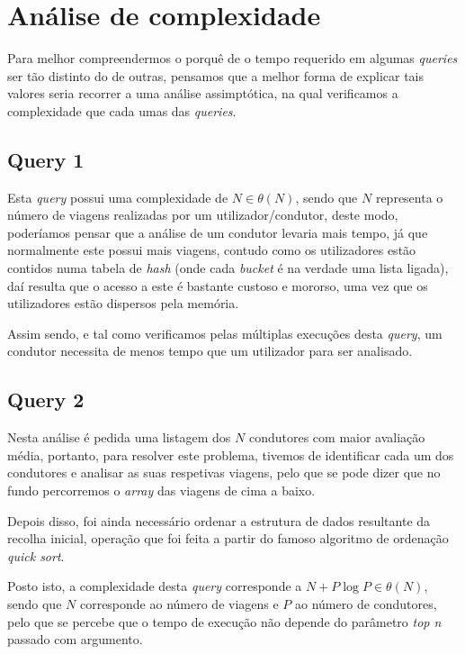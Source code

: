 \documentclass[12pt,a4paper]{report}
\begin{document}
\chapter{Análise de complexidade}

Para melhor compreendermos o porquê de o tempo requerido em algumas \textit{queries} ser tão distinto do de outras, pensamos que a melhor forma de explicar tais valores seria recorrer a uma análise assimptótica, na qual verificamos a complexidade que cada umas das \textit{queries}.

\section{Query 1}

Esta \textit{query} possui uma complexidade de \( N \in \theta(N)\), sendo que \(N\) representa o número de viagens realizadas por um utilizador/condutor, deste modo, poderíamos pensar que a análise de um condutor levaria mais tempo, já que normalmente este possui mais viagens, contudo como os utilizadores estão contidos numa tabela de \textit{hash} (onde cada \textit{bucket} é na verdade uma lista ligada), daí resulta que o acesso a este é bastante custoso e mororso, uma vez que os utilizadores estão dispersos pela memória.

Assim sendo, e tal como verificamos pelas múltiplas execuções desta \textit{query}, um condutor necessita de menos tempo que um utilizador para ser analisado.

\section{Query 2}

Nesta análise é pedida uma listagem dos \(N\) condutores com maior avaliação média, portanto, para resolver este problema, tivemos de identificar cada um dos condutores e analisar as suas respetivas viagens, pelo que se pode dizer que no fundo percorremos o \textit{array} das viagens de cima a baixo.

Depois disso, foi ainda necessário ordenar a estrutura de dados resultante da recolha inicial, operação que foi feita a partir do famoso algoritmo de ordenação \textit{quick sort}.

Posto isto, a complexidade desta \textit{query} corresponde a \(N + P\log P \in\theta(N)\), sendo que \(N\) corresponde ao número de viagens e \(P\) ao número de condutores, pelo que se percebe que o tempo de execução não depende do parâmetro \textit{top n} passado com argumento.
\end{document}
